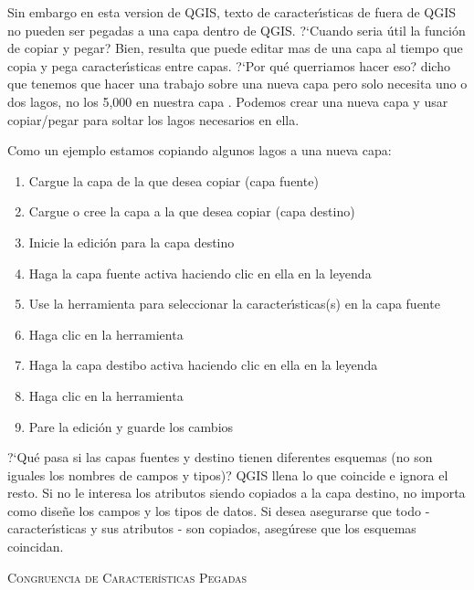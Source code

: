 Sin embargo en esta version de QGIS, texto de caracter\'{\i}sticas de fuera de QGIS no pueden 
ser pegadas a una capa dentro de QGIS. ?`Cuando seria \'util la funci\'on de copiar y pegar? 
Bien, resulta que puede editar mas de una capa 
al tiempo que copia y pega caracter\'{\i}sticas entre capas. ?`Por qu\'e querriamos hacer
eso?  dicho que tenemos que hacer una trabajo sobre una nueva capa pero solo necesita uno o
dos lagos, no los 5,000 en nuestra capa . Podemos crear una nueva capa
y usar copiar/pegar para soltar los lagos necesarios en ella. 

Como un ejemplo estamos copiando algunos lagos a una nueva capa:

\begin{enumerate}
\item Cargue la capa de la que desea copiar (capa fuente)
\item Cargue o cree la capa a la que desea copiar (capa destino) 
\item Inicie la edici\'on para la capa destino
\item Haga la capa fuente activa haciendo clic en ella en la leyenda 
\item Use la herramienta  para seleccionar la caracter\'{\i}sticas(s) en la capa fuente
\item Haga clic en la herramienta 
\item Haga la capa destibo activa haciendo clic en ella en la leyenda 
\item Haga clic en la herramienta 
\item Pare la edici\'on y guarde los cambios
\end{enumerate}

?`Qu\'e pasa si las capas fuentes y destino tienen
diferentes esquemas (no son iguales los nombres de campos y tipos)? QGIS llena
lo que coincide e ignora el resto. Si no le interesa los atributos
siendo copiados a la capa destino, no importa como dise\~ne los
campos y los tipos de datos. Si desea asegurarse que todo - caracter\'{\i}sticas y sus
atributos - son copiados, aseg\'urese que los esquemas coincidan.

\begin{Tip}[ht]\caption{\textsc{Congruencia de Caracter\'{\i}sticas Pegadas}}
\end{Tip}

